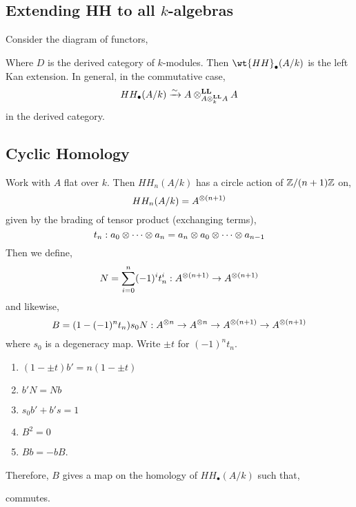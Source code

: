 \documentclass[12pt]{article}
\begin{document}
\subsection{Extending HH to all $k$-algebras}

Consider the diagram of functors,
\begin{center}
\end{center}
Where $D$ is the derived category of $k$-modules. Then $\wt{HH}_\bullet(A/k)$ is the left Kan extension. In general, in the commutative case,
\[ HH_\bullet(A/k) \xrightarrow{\sim} A \otimes^{\mathbf{LL}}_{A \otimes^{\mathbf{LL}}_{k} A} A \]
in the derived category.

\subsection{Cyclic Homology}

Work with $A$ flat over $k$. Then $HH_n(A/k)$ has a circle action of $\mathbb{Z} / (n+1) \mathbb{Z}$ on,
\[ HH_n(A/k) = A^{\otimes (n+1)} \]
given by the brading of tensor product (exchanging terms),
\[ t_n : a_0 \otimes \cdots \otimes a_n = a_n \otimes a_0 \otimes \cdots \otimes a_{n-1} \]
Then we define,
\[ N = \sum_{i = 0}^n (-1)^i t_n^i : A^{\otimes (n+1)} \to A^{\otimes (n+1)} \]
and likewise,
\[ B = (1 - (-1)^n t_n) s_0 N : A^{\otimes n} \to A^{\otimes n} \to A^{\otimes (n+1)} \to A^{\otimes (n+1)} \]
where $s_0$ is a degeneracy map. Write $\pm t$ for $(-1)^n t_n$.

\begin{lemma}
\begin{enumerate}
\item $(1 - \pm t) b' = n(1 - \pm t)$
\item $b' N = N b$
\item $s_0 b' + b' s = 1$
\item $B^2 = 0$
\item $B b = - bB$.
\end{enumerate}
Therefore, $B$ gives a map on the homology of $HH_\bullet(A/k)$ such that,
\begin{center}
\end{center}
commutes.
\end{lemma}
\end{document}

